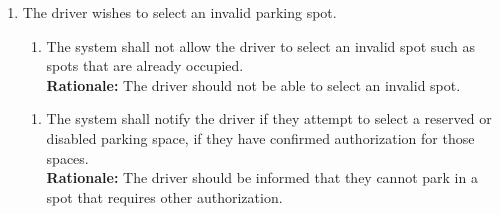 \documentclass[12pt,letterpaper]{article}
\newcounter{businesseventnum}
\newcounter{funcreqnum}
\begin{document}
\begin{enumerate}[{BE}\thebusinesseventnum.] 
\item The driver wishes to select an invalid parking spot.

    \begin{enumerate}[{FR}\thefuncreqnum.] 
    \color{red}
        \item The system shall not allow the driver to select an invalid spot
        such as spots that are already occupied.\\
        \textbf{Rationale:} The driver should not be able to select an invalid
        spot.
    \end{enumerate}

\begin{enumerate}[{FR}\thefuncreqnum.] 
    \item The system shall notify the driver if they attempt to select a
    reserved or disabled parking space, if they have confirmed authorization for
    those spaces.\\
    \textbf{Rationale:} The driver should be informed that they cannot park in a
    spot that requires other authorization.
\end{enumerate}

\end{enumerate}
\end{document}

